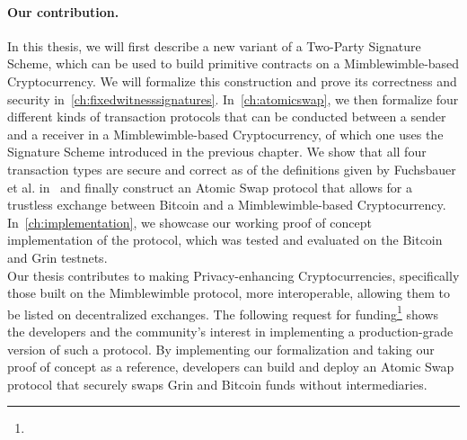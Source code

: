 \paragraph{Our contribution.} In this thesis, we will first describe a new variant of a Two-Party Signature Scheme, which can be used to build primitive contracts on a Mimblewimble-based Cryptocurrency.
We will formalize this construction and prove its correctness and security in~\cref{ch:fixedwitnesssignatures}.
In~\cref{ch:atomicswap}, we then formalize four different kinds of transaction protocols that can be conducted between a sender and a receiver in a Mimblewimble-based Cryptocurrency, of which one uses the Signature Scheme introduced in the previous chapter.
We show that all four transaction types are secure and correct as of the definitions given by Fuchsbauer et al. in~\cite{fuchsbauer2019aggregate} and finally construct an Atomic Swap protocol that allows for a trustless exchange between Bitcoin and a Mimblewimble-based Cryptocurrency.
In~\cref{ch:implementation}, we showcase our working proof of concept implementation of the protocol, which was tested and evaluated on the Bitcoin and Grin testnets.\\
Our thesis contributes to making Privacy-enhancing Cryptocurrencies, specifically those built on the Mimblewimble protocol, more interoperable, allowing them to be listed on decentralized exchanges.
The following request for funding\footnote{\urlgrinfund} shows the developers and the community's interest in implementing a production-grade version of such a protocol.
By implementing our formalization and taking our proof of concept as a reference, developers can build and deploy an Atomic Swap protocol that securely swaps Grin and Bitcoin funds without intermediaries.

